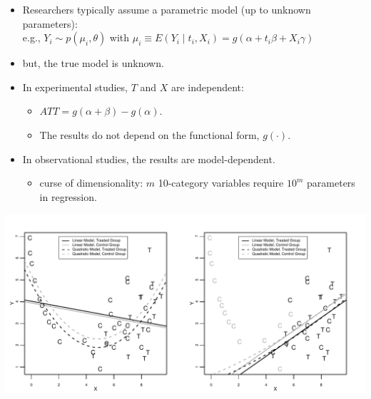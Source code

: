 \documentclass[20pt,landscape,pdftex]{foils}
\begin{document}
\begin{itemize}
\zerolistvertdimens 
\item Researchers typically assume a parametric model (up to unknown
  parameters):\\ e.g., $Y_i \sim p(\mu_i, \theta)$ with $\mu_i \equiv
  E(Y_i \mid t_i, X_i)=g(\alpha+t_i \beta + X_i \gamma)$\pause
\item but, the true model is unknown.\pause
\item In experimental studies, $T$ and $X$ are independent:\pause 
  \begin{itemize}
  \item $ATT = g(\alpha+\beta) - g(\alpha).$\pause
  \item The results do not depend on the functional form,
    $g(\cdot)$.\pause 
  \end{itemize}
\item In observational studies, the results are model-dependent.\pause
  \begin{itemize}
  \item curse of dimensionality: $m$ 10-category variables require
    $10^m$ parameters in regression.\pause
  \end{itemize}
\end{itemize}

 \begin{center}
   \includegraphics{figs/olspanel-thick.pdf}
 \end{center}



\hypersetup{pdfpagetransition=Replace}
\end{document}
